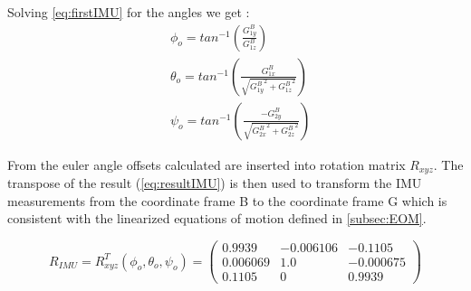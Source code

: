 Solving \cref{eq:firstIMU} for the angles we get :
\begin{align}
   & \phi_o=tan^{-1}\left(\frac{G_{1y}^B}{G_{1z}^B}\right)
   \label{eq:offset1}
   \\
   & \theta_o= tan^{-1}\left(\frac{G_{1 x}^B}{\sqrt{{G_{1 y}^B}^{2}+{G_{1 z}^B}^{2}}}\right) 
   \label{eq:offset2}
   \\
   & \psi_o = tan^{-1}\left(\frac{-G_{2 y}^B}{\sqrt{{G_{2 x}^B}^{2}+{G_{2 z}^B}^{2}}}\right)
   \label{eq:offset3}
\end{align}

From  the euler angle offsets calculated are inserted into rotation matrix \ensuremath{R_{\mathit{xyz}}}. The transpose of the result (\ref{eq:resultIMU}) is then used to transform the IMU measurements from the coordinate frame B to the coordinate frame G which is consistent with the linearized equations of motion defined in \cref{subsec:EOM}.

\begin{equation}
R_{\mathit{IMU}}=R_{\mathit{xyz}}^T(\phi_o,\theta_o,\psi_o)=\left(\begin{array}{ccc} 0.9939 & -0.006106 & -0.1105\\ 0.006069 & 1.0 & -0.000675\\ 0.1105 & 0 & 0.9939 \end{array}\right)
    \label{eq:resultIMU}
\end{equation}